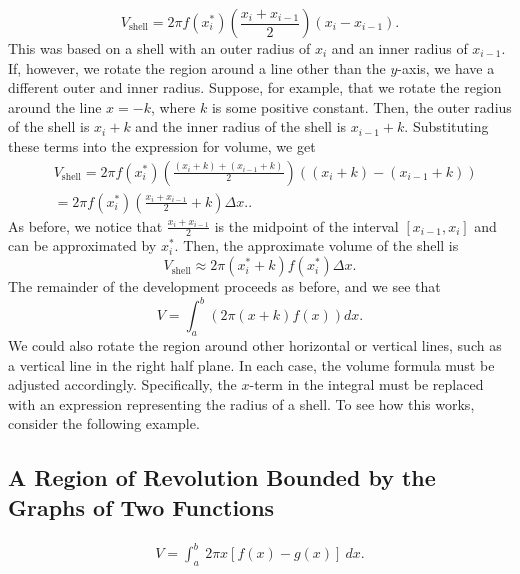\documentclass{report}
\begin{document}
    \[
    V_{\text{shell}} = 2\pi f(x^*_i) \left( \frac{x_i + x_{i-1}}{2} \right) (x_i - x_{i-1}).
    \]
    This was based on a shell with an outer radius of \( x_i \) and an inner radius of \( x_{i-1} \). If, however, we rotate the region around a line other than the \( y \)-axis, we have a different outer and inner radius. Suppose, for example, that we rotate the region around the line \( x = -k \), where \( k \) is some positive constant. Then, the outer radius of the shell is \( x_i + k \) and the inner radius of the shell is \( x_{i-1} + k \). Substituting these terms into the expression for volume, we get
    \begin{align*}
        &V_{\text{shell}} = 2\pi f(x^*_i) \left( \frac{(x_i + k) + (x_{i-1} + k)}{2} \right) ((x_i + k) - (x_{i-1} + k))  \\
        &= 2\pi f(x^*_i) \left( \frac{x_i + x_{i-1}}{2} + k \right) \Delta x.
    .\end{align*}
    As before, we notice that \( \frac{x_i + x_{i-1}}{2} \) is the midpoint of the interval \( [x_{i-1}, x_i] \) and can be approximated by \( x^*_i \). Then, the approximate volume of the shell is
    \[
    V_{\text{shell}} \approx 2\pi (x^*_i + k) f(x^*_i) \Delta x.
    \]
    The remainder of the development proceeds as before, and we see that
    \[
    V = \int_{a}^{b} \left( 2\pi (x + k) f(x) \right) dx.
    \]
    We could also rotate the region around other horizontal or vertical lines, such as a vertical line in the right half plane. In each case, the volume formula must be adjusted accordingly. Specifically, the \( x \)-term in the integral must be replaced with an expression representing the radius of a shell. To see how this works, consider the following example.

    \pagebreak 
    \subsection*{A Region of Revolution Bounded by the Graphs of Two Functions}
    \bigbreak \noindent 
    \begin{thrm}
       \begin{align*}
           V = \int_{a}^{b}\ 2\pi x\left[f(x)-g(x)\right]\ dx
       .\end{align*} 
    \end{thrm}
\end{document}
